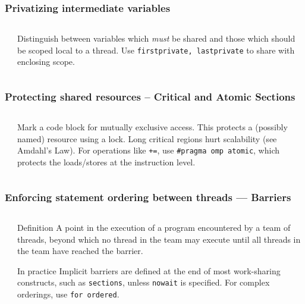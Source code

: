\documentclass[]{beamer}
\begin{document}
\begin{frame}[fragile]
  \frametitle{Privatizing intermediate variables}
  \begin{columns}[t]%
    \begin{column}{0.6\textwidth}
    \end{column}
    \begin{column}{0.4\textwidth}
      Distinguish between variables which \emph{must} be shared and those which should be scoped local to a thread. Use \texttt{firstprivate, lastprivate} to share with enclosing scope. 
    \end{column}
  \end{columns}
\end{frame}


\begin{frame}[fragile]
  \frametitle{Protecting shared resources -- Critical and Atomic Sections}
  \begin{columns}[t]
    \begin{column}{0.7\textwidth}
    \end{column}
    \begin{column}{0.4\textwidth}
      Mark a code block for mutually exclusive access. This protects a (possibly named) resource using a lock. Long critical regions hurt scalability (see Amdahl's Law). For operations like \texttt{+=}, use \texttt{\#pragma omp atomic}, which protects the loads/stores at the instruction level.
      
    \end{column}
  \end{columns}
\end{frame}


\begin{frame}[fragile]
  \frametitle{Enforcing statement ordering between threads --- Barriers}
  \begin{columns}[t]%
    \begin{column}{0.6\textwidth}
    \end{column}
    \begin{column}{0.5\textwidth}
      \begin{block}{Definition}
      A point in the execution of a program encountered by a team of threads, beyond which no thread in the team may execute until all threads in the team have reached the barrier.
      \end{block}
      \begin{block}{In practice}
          Implicit barriers are defined at the end of most work-sharing constructs, such as \texttt{sections}, unless \texttt{nowait} is specified. For complex orderings, use \texttt{for ordered}.
      \end{block}
    \end{column}
  \end{columns}
\end{frame}
\end{document}
